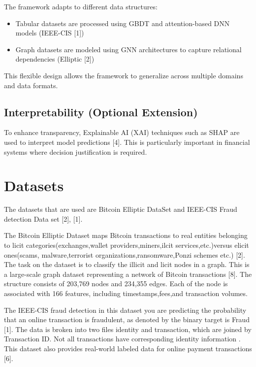 \documentclass[conference]{IEEEtran}
\begin{document}
The framework adapts to different data structures:
\begin{itemize}
    \item Tabular datasets are processed using GBDT and attention-based DNN models (IEEE-CIS [1])
    \item Graph datasets are modeled using GNN architectures to capture relational dependencies (Elliptic [2])
\end{itemize}

This flexible design allows the framework to generalize across multiple domains and data formats.

\subsection{Interpretability (Optional Extension)}

To enhance transparency, Explainable AI (XAI) techniques such as SHAP are used to interpret model predictions [4]. This is particularly important in financial systems where decision justification is required.


\section{Datasets}

The datasets that are used are Bitcoin Elliptic DataSet and IEEE-CIS Fraud detection Data set [2], [1].

The Bitcoin Elliptic Dataset maps Bitcoin transactions to real entities belonging to licit categories(exchanges,wallet providers,miners,ilcit services,etc.)versus elicit ones(scams, malware,terrorist organizations,ransomware,Ponzi schemes etc.) [2]. The task on the dataset is to classify the illicit and licit nodes in a graph. This is a large-scale graph dataset representing a network of Bitcoin transactions [8]. The structure consists of 203,769 nodes and 234,355 edges. Each of the node is associated with 166 features, including timestamps,fees,and transaction volumes.

The IEEE-CIS fraud detection in this dataset you are predicting the probability that an online transaction is fraudulent, as denoted by the binary target is Fraud [1]. The data is broken into two files identity and transaction, which are joined by Transaction ID. Not all transactions have corresponding identity information . This dataset also provides real-world labeled data for online payment transactions [6].
\end{document}
